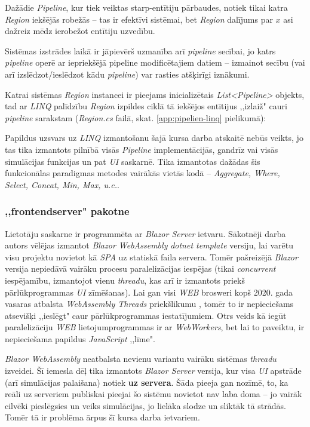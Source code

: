 Dažādie \emph{Pipeline}, kur tiek veiktas starp-entītiju pārbaudes, notiek tikai
katra \emph{Region} iekšējās robežās -- tas ir efektīvi sistēmai, bet \emph{Region}
dalījums par \(x\) asi dažreiz mēdz ierobežot entītiju uzvedību.

Sistēmas izstrādes laikā ir jāpievērš uzmanība arī \emph{pipeline} secībai, jo katrs \emph{pipeline}
operē ar iepriekšējā pipeline modificētajiem datiem -- izmainot secību
(vai arī izslēdzot/ieslēdzot kādu \emph{pipeline}) var rasties atšķirīgi iznākumi.

Katrai sistēmas \emph{Region} instancei ir pieejams inicializētais \emph{List<Pipeline>}
objekts, tad ar \emph{LINQ} palīdzību \emph{Region} izpildes ciklā tā iekšējos entītijus
,,izlaiž" cauri \emph{pipeline} sarakstam (\emph{Region.cs} failā, skat. \ref{app:pipelien-linq} pielikumā):

Papildus uzsvars uz \emph{LINQ} izmantošanu šajā kursa darba atskaitē nebūs veikts,
jo tas tika izmantots pilnībā visās \emph{Pipeline} implementācijās, gandrīz vai
visās simulācijas funkcijas un pat \emph{UI} saskarnē. Tika izmantotas dažādas šis
funkcionālas paradigmas metodes vairākās vietās kodā -- \emph{Aggregate, Where, Select, Concat, Min, Max, u.c.}.


\subsubsection{,,frontendserver" pakotne}


Lietotāju saskarne ir programmēta ar \emph{Blazor Server} ietvaru. Sākotnēji darba
autors vēlējas izmantot \emph{Blazor WebAssembly} \emph{dotnet template} versiju,
lai varētu visu projektu novietot kā \emph{SPA}\cite{progr:SPA} uz statiskā faila servera. Tomēr
pašreizējā \emph{Blazor} versija nepiedāvā vairāku procesu paralelizācijas iespējas
(tikai \emph{concurrent} iespējamību, izmantojot vienu \emph{threadu}, kas arī ir
izmantots priekš pārlūkprogrammas \emph{UI} zīmēšanas)\cite{csharp:blazor-no-multithreaded-support}. Lai gan
visi \emph{WEB} brosweri kopš 2020. gada vasaras atbalsta \emph{WebAssembly Threads}
priekšlikumu \cite{wasm:threads-proposal}, tomēr to ir nepieciešams atsevišķi
,,ieslēgt" caur pārlūkprogrammas iestatījumiem. Otrs veids kā iegūt paralelizāciju \emph{WEB}
lietojumprogrammas ir ar \emph{WebWorkers}, bet lai to paveiktu, ir nepieciešama
papildus \emph{JavaScript} ,,līme".

\emph{Blazor WebAssembly} neatbalsta nevienu variantu vairāku
sistēmas \emph{threadu} izveidei. Šī iemesla dēļ tika izmantots \emph{Blazor Server}
versija, kur visa \emph{UI} apstrāde (arī simulācijas palaišana) notiek \textbf{uz servera}. Šāda
pieeja gan nozīmē, to, ka reāli uz serveriem publiskai pieejai šo sistēmu novietot nav laba doma -- jo
vairāk cilvēki pieslēgsies un veiks simulācijas, jo lielāka slodze un sliktāk tā strādās.
Tomēr tā ir problēma ārpus šī kursa darba ietvariem.

